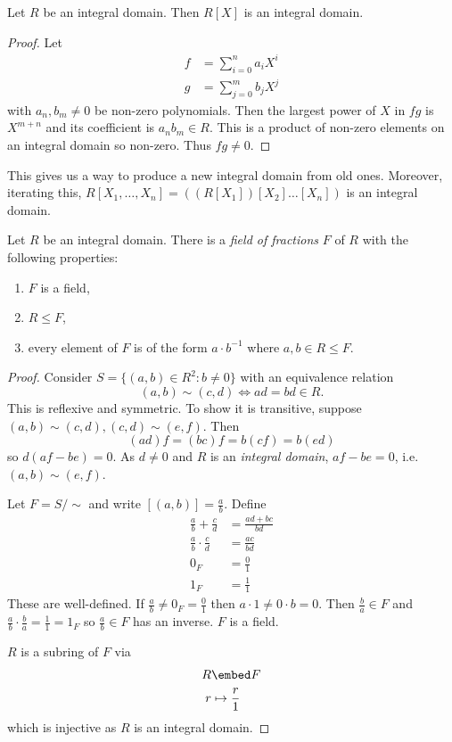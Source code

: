 \documentclass[a4paper]{article}
\theoremstyle{definition}
\begin{document}
\begin{lemma}
  Let \(R\) be an integral domain. Then \(R[X]\) is an integral domain.
\end{lemma}

\begin{proof}
  Let
  \begin{align*}
    f &= \sum_{i = 0}^n a_iX^i \\
    g &= \sum_{j = 0}^m b_jX^j
  \end{align*}
  with \(a_n, b_m \neq 0\) be non-zero polynomials. Then the largest power of \(X\) in \(fg\) is \(X^{m + n}\) and its coefficient is \(a_nb_m \in R\). This is a product of non-zero elements on an integral domain so non-zero. Thus \(fg \neq 0\).
\end{proof}

This gives us a way to produce a new integral domain from old ones. Moreover, iterating this, \(R[X_1, \dots, X_n] = ((R[X_1])[X_2]\dots[X_n])\) is an integral domain.

\begin{theorem}
  Let \(R\) be an integral domain. There is a \emph{field of fractions} \(F\) of \(R\) with the following properties:
  \begin{enumerate}
  \item \(F\) is a field,
  \item \(R \leq F\),
  \item every element of \(F\) is of the form \(a \cdot b^{-1}\) where \(a, b \in R \leq F\).
  \end{enumerate}
\end{theorem}

\begin{proof}
  Consider \(S = \{(a, b) \in R^2: b \neq 0\}\) with an equivalence relation
  \[
    (a, b) \sim (c, d) \Leftrightarrow ad = bd \in R.
  \]
  This is reflexive and symmetric. To show it is transitive, suppose \((a, b) \sim (c, d), (c, d) \sim (e, f)\). Then
  \[
    (ad)f = (bc)f = b(cf) = b(ed)
  \]
  so \(d(af - be) = 0\). As \(d \neq 0\) and \(R\) is an \emph{integral domain}, \(af - be = 0\), i.e.\ \((a, b) \sim (e, f)\).

  Let \(F = S/\sim\) and write \([(a, b)] = \frac{a}{b}\). Define
  \begin{align*}
    \frac{a}{b} + \frac{c}{d} &= \frac{ad + bc}{bd} \\
    \frac{a}{b} \cdot \frac{c}{d} &= \frac{ac}{bd} \\
    0_F &= \frac{0}{1} \\
    1_F &= \frac{1}{1}
  \end{align*}
  These are well-defined. If \(\frac{a}{b} \neq 0_F = \frac{0}{1}\) then \(a \cdot 1\neq 0 \cdot b = 0\). Then \(\frac{b}{a} \in F\) and \(\frac{a}{b} \cdot \frac{b}{a} = \frac{1}{1} = 1_F\) so \(\frac{a}{b} \in F\) has an inverse. \(F\) is a field.

  \(R\) is a subring of \(F\) via
  \begin{align*}
    R &\embed F \\
    r &\mapsto \frac{r}{1}
  \end{align*}
  which is injective as \(R\) is an integral domain.
\end{proof}
\end{document}
